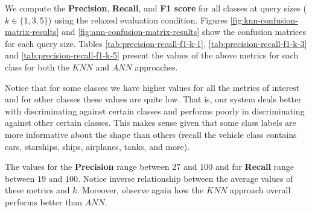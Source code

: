 We compute the \textbf{Precision}, \textbf{Recall}, and \textbf{F1 score} for all classes at query sizes ($k \in  \{1, 3, 5\}$) using the relaxed evaluation condition.
Figures \ref{fig:knn-confusion-matrix-results} and \ref{fig:ann-confusion-matrix-results} show the confusion matrices for each query size.
Tables \ref{tab:precision-recall-f1-k-1}, \ref{tab:precision-recall-f1-k-3} and \ref{tab:precision-recall-f1-k-5} present the values of the above metrics for each class for both the $KNN$ and $ANN$ approaches.

Notice that for some classes we have higher values for all the metrics of interest and for other classes these values are quite low.
That is, our system deals better with discriminating against certain classes and performs poorly in discriminating against other certain classes.
This makes sense given that some class labels are more informative about the shape than others (recall the vehicle class contains cars, starships, ships, airplanes, tanks, and more).

The values for the \textbf{Precision} range between $27$ and $100$ and for \textbf{Recall} range between $19$ and $100$.
Notice inverse relationship between the average values of these metrics and $k$.
Moreover, observe again how the $KNN$ approach overall performs better than $ANN$.

